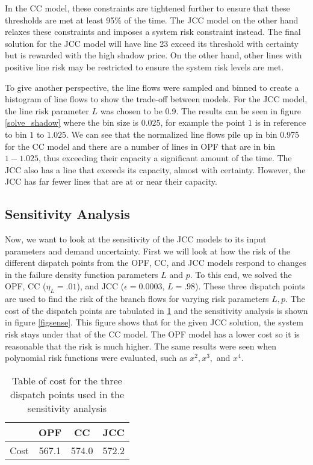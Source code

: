 In the CC model, these constraints are tightened further to ensure that these thresholds are met at least 95\% of the time.  The JCC model on the other hand relaxes these constraints and imposes a system risk constraint instead.  The final solution for the JCC model will have line 23 exceed its threshold with certainty but is rewarded with the high shadow price.  On the other hand, other lines with positive line risk may be restricted to ensure the system risk levels are met.

To give another perspective, the line flows were sampled and binned to create a histogram of line flows to show the trade-off between models.  For the JCC model, the line risk parameter $L$ was chosen to be 0.9.  The results can be seen in figure \ref{solve_shadow} where the bin size is $0.025$, for example the point $1$ is in reference to bin $1$ to $1.025$.  We can see that the normalized line flows pile up in bin 0.975 for the CC model and there are a number of lines in OPF that are in bin $1-1.025$, thus exceeding their capacity a significant amount of the time.  The JCC also has a line that exceeds its capacity, almost with certainty.  However, the JCC has far fewer lines that are at or near their capacity.



\subsection{Sensitivity Analysis}\label{senseanal}
Now, we want to look at the sensitivity of the JCC models to its input parameters and demand uncertainty.  First we will look at how the risk of the different dispatch points from the OPF, CC, and JCC models respond to changes in the failure density function parameters $L$ and $p$.  To this end, we solved the OPF, CC ($\eta_L=.01$), and JCC ($\epsilon=0.0003$, $L=.98$).  These three dispatch points are used to find the risk of the branch flows for varying risk parameters $L,p$. The cost of the dispatch points are tabulated in \ref{tabsense} and the sensitivity analysis is shown in figure \ref{figsense}. This figure shows that for the given JCC solution, the system risk stays under that of the CC model.  The OPF model has a lower cost so it is reasonable that the risk is much higher.  The same results were seen when polynomial risk functions were evaluated, such as $x^2,x^3,$ and $x^4$.


\begin{table}
\centering
 \begin{tabular}{ |c| c c c |}
\hline
& OPF & CC & JCC \\
\hline
\hline
Cost & 567.1 & 574.0 & 572.2\\
\hline
\end{tabular}
\caption{Table of cost for the three dispatch points used in the sensitivity analysis}\label{tabsense}
\end{table}


